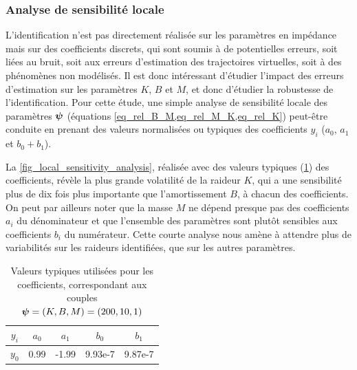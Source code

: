 \subsubsection{Analyse de sensibilité locale} \label{chap3_sec_method_sub_ident_1}

L'identification n'est pas directement réalisée sur les paramètres en impédance mais sur des coefficients discrets, qui sont soumis à de potentielles erreurs, soit liées au bruit, soit aux erreurs d'estimation des trajectoires virtuelles, soit à des phénomènes non modélisés. Il est donc intéressant d'étudier l'impact des erreurs d'estimation sur les paramètres $K$, $B$ et $M$, et donc d'étudier la robustesse de l'identification. Pour cette étude, une simple analyse de sensibilité locale des paramètres $\vect{\psi}$ (équations \cref{eq_rel_B_M,eq_rel_M_K,eq_rel_K}) peut-être conduite en prenant des valeurs normalisées ou typiques des coefficients $y_i$ ($a_0$, $a_1$ et $b_0+b_1$).

%



La \cref{fig_local_sensitivity_analysis}, réalisée avec des valeurs typiques (\cref{tab_typical_coefficient_sensitivity_analysis}) des coefficients, révèle la plus grande volatilité de la raideur $K$, qui a une sensibilité plus de dix fois plus importante que l'amortissement $B$, à chacun des coefficients. On peut par ailleurs noter que la masse $M$ ne dépend presque pas des coefficients $a_i$ du dénominateur et que l'ensemble des paramètres sont plutôt sensibles aux coefficients $b_i$ du numérateur. Cette courte analyse nous amène à attendre plus de variabilités sur les raideurs identifiées, que sur les autres paramètres.

\begin{table}[htbp] 
	\begin{center}
		\begin{tabular}{|c|c|c|c|c|}
			\hline  
			$y_i$ & $a_0$ & $a_1$ & $b_0$ & $b_1$ \\
			\hline
			$y_0$ & 0.99 & -1.99 & 9.93e-7 & 9.87e-7\\
			\hline
		\end{tabular}
	\end{center}
	\caption[Valeurs typiques des paramètres du modèle en impédance discrétisé]{Valeurs typiques utilisées pour les coefficients, correspondant aux couples $\vect{\psi} = (K,B,M) = (200,10,1)$}
	\label{tab_typical_coefficient_sensitivity_analysis}	
\end{table}

